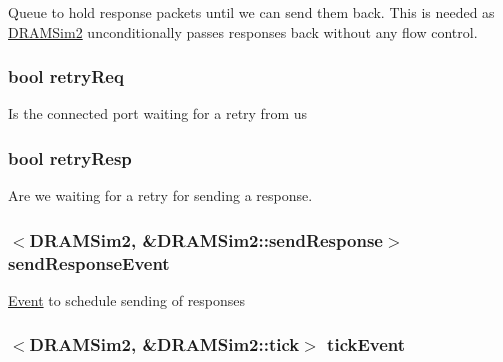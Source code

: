\label{classDRAMSim2_a7dd56c8ca058e3e734ec0460b1587932}
Queue to hold response packets until we can send them back. This is needed as \hyperlink{classDRAMSim2}{DRAMSim2} unconditionally passes responses back without any flow control. \hypertarget{classDRAMSim2_aab3b947b2633a30b5973a39b7e9b018a}{
\subsubsection[{retryReq}]{\setlength{\rightskip}{0pt plus 5cm}bool {\bf retryReq}}}
\label{classDRAMSim2_aab3b947b2633a30b5973a39b7e9b018a}
Is the connected port waiting for a retry from us \hypertarget{classDRAMSim2_a6ddfdd4eb676d50001bda88567e6da14}{
\subsubsection[{retryResp}]{\setlength{\rightskip}{0pt plus 5cm}bool {\bf retryResp}}}
\label{classDRAMSim2_a6ddfdd4eb676d50001bda88567e6da14}
Are we waiting for a retry for sending a response. \hypertarget{classDRAMSim2_a46a89603d961c3ae9b2cb2df412503f6}{
\subsubsection[{sendResponseEvent}]{$<${\bf DRAMSim2}, \&DRAMSim2::sendResponse$>$ {\bf sendResponseEvent}}}
\label{classDRAMSim2_a46a89603d961c3ae9b2cb2df412503f6}
\hyperlink{classEvent}{Event} to schedule sending of responses \hypertarget{classDRAMSim2_acab0bec584b681055f948abbbaf8acb2}{
\subsubsection[{tickEvent}]{$<${\bf DRAMSim2}, \&DRAMSim2::tick$>$ {\bf tickEvent}}}

